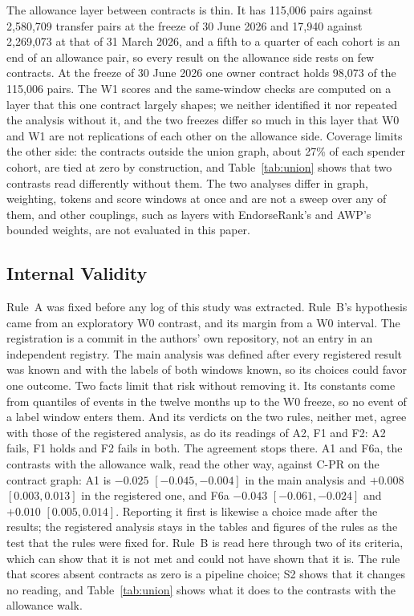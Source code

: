 \documentclass{ieeeaccess}
\newcommand{\cpr}{\mbox{C-PR}}
\begin{document}
The allowance layer between contracts is thin. It has 115,006 pairs against 2,580,709 transfer pairs at the freeze of 30 June 2026 and 17,940 against 2,269,073 at that of 31 March 2026, and a fifth to a quarter of each cohort is an end of an allowance pair, so every result on the allowance side rests on few contracts. At the freeze of 30 June 2026 one owner contract holds 98,073 of the 115,006 pairs. The W1 scores and the same-window checks are computed on a layer that this one contract largely shapes; we neither identified it nor repeated the analysis without it, and the two freezes differ so much in this layer that W0 and W1 are not replications of each other on the allowance side. Coverage limits the other side: the contracts outside the union graph, about 27\% of each spender cohort, are tied at zero by construction, and Table~\ref{tab:union} shows that two contrasts read differently without them. The two analyses differ in graph, weighting, tokens and score windows at once and are not a sweep over any of them, and other couplings, such as layers with EndorseRank's and AWP's bounded weights, are not evaluated in this paper.

\subsection{Internal Validity}
Rule~A was fixed before any log of this study was extracted. Rule~B's hypothesis came from an exploratory W0 contrast, and its margin from a W0 interval. The registration is a commit in the authors' own repository, not an entry in an independent registry. The main analysis was defined after every registered result was known and with the labels of both windows known, so its choices could favor one outcome. Two facts limit that risk without removing it. Its constants come from quantiles of events in the twelve months up to the W0 freeze, so no event of a label window enters them. And its verdicts on the two rules, neither met, agree with those of the registered analysis, as do its readings of A2, F1 and F2: A2 fails, F1 holds and F2 fails in both. The agreement stops there. A1 and F6a, the contrasts with the allowance walk, read the other way, against \cpr{} on the contract graph: A1 is $-0.025$ $[-0.045,-0.004]$ in the main analysis and $+0.008$ $[0.003,0.013]$ in the registered one, and F6a $-0.043$ $[-0.061,-0.024]$ and $+0.010$ $[0.005,0.014]$. Reporting it first is likewise a choice made after the results; the registered analysis stays in the tables and figures of the rules as the test that the rules were fixed for. Rule~B is read here through two of its criteria, which can show that it is not met and could not have shown that it is. The rule that scores absent contracts as zero is a pipeline choice; S2 shows that it changes no reading, and Table~\ref{tab:union} shows what it does to the contrasts with the allowance walk.
\end{document}

